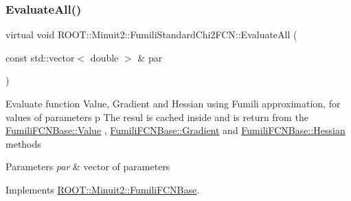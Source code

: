 \mbox{\label{classROOT_1_1Minuit2_1_1FumiliStandardChi2FCN_ace15dd1aad435e460c523bc37bff12a8}} 
\subsubsection{\texorpdfstring{EvaluateAll()}{EvaluateAll()}\hspace{0.1cm}{\footnotesize\ttfamily [1/3]}}
{\footnotesize\ttfamily virtual void R\+O\+O\+T\+::\+Minuit2\+::\+Fumili\+Standard\+Chi2\+F\+C\+N\+::\+Evaluate\+All (\begin{DoxyParamCaption}\item[{const std\+::vector$<$ double $>$ \&}]{par }\end{DoxyParamCaption})\hspace{0.3cm}{\ttfamily [virtual]}}

Evaluate function Value, Gradient and Hessian using Fumili approximation, for values of parameters p The resul is cached inside and is return from the \mbox{\hyperlink{classROOT_1_1Minuit2_1_1FumiliFCNBase_a221dacee0ccde747a271a0cecd759f98}{Fumili\+F\+C\+N\+Base\+::\+Value}} , \mbox{\hyperlink{classROOT_1_1Minuit2_1_1FumiliFCNBase_ad226939ea2e83f754b5a6afc30876d3e}{Fumili\+F\+C\+N\+Base\+::\+Gradient}} and \mbox{\hyperlink{classROOT_1_1Minuit2_1_1FumiliFCNBase_ade134d8c6613393e942ef98d445db376}{Fumili\+F\+C\+N\+Base\+::\+Hessian}} methods


\begin{DoxyParams}{Parameters}
{\em par} & vector of parameters \\
\hline
\end{DoxyParams}


Implements \mbox{\hyperlink{classROOT_1_1Minuit2_1_1FumiliFCNBase_a0741bb4a7405cc33ab60583472a189cb}{R\+O\+O\+T\+::\+Minuit2\+::\+Fumili\+F\+C\+N\+Base}}.

\mbox{\label{classROOT_1_1Minuit2_1_1FumiliStandardChi2FCN_a76f42b6e5d2a92961a9fd8feca38b582}} 
